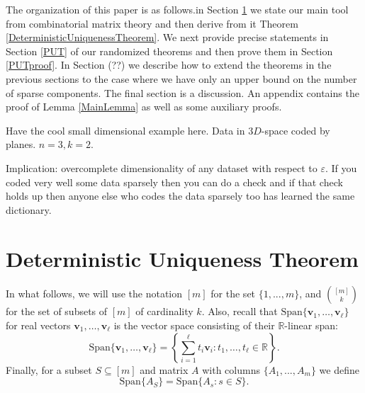 \documentclass[journal, onecolumn]{IEEEtran}
\begin{document}
The organization of this paper is as follows.in Section \ref{DUT} we state our main tool from combinatorial matrix theory and then derive from it Theorem \ref{DeterministicUniquenessTheorem}. We next provide precise statements in Section \ref{PUT} of our randomized theorems and then prove them in Section \ref{PUTproof}. In Section (??) we describe how to extend the theorems in the previous sections to the case where we have only an upper bound on the number of sparse components. The final section is a discussion. An appendix contains the proof of Lemma \ref{MainLemma} as well as some auxiliary proofs. 

Have the cool small dimensional example here. Data in $3D$-space coded by planes. $n=3, k=2$. 

Implication: overcomplete dimensionality of any dataset with respect to $\varepsilon$. If you coded very well some data sparsely then you can do a check and if that check holds up then anyone else who codes the data sparsely too has learned the same dictionary. 
 

\section{Deterministic Uniqueness Theorem}\label{DUT}

In what follows, we will use the notation $[m]$ for the set $\{1, ..., m\}$, and ${[m] \choose k}$ for the set of subsets of $[m]$ of cardinality $k$. Also, recall that $\text{Span}\{\mathbf{v}_1, \ldots, \mathbf{v}_\ell\}$ for real vectors $\mathbf{v}_1, \ldots, \mathbf{v}_\ell$ is the vector space consisting of their $\mathbb{R}$-linear span:
%
\[ \text{Span}\{\mathbf{v}_1, \ldots, \mathbf{v}_\ell\} = \left\{ \sum_{i=1}^\ell t_i\mathbf{v}_i : t_1, \ldots, t_\ell \in \mathbb{R}\right\}. \]
%
Finally, for a subset $S \subseteq [m]$ and matrix $A$ with columns $\{A_1,...,A_m\}$ we define
%
\[ \text{Span}\{A_S\} = \text{Span}\{A_s: s \in S\}. \]

\end{document}
